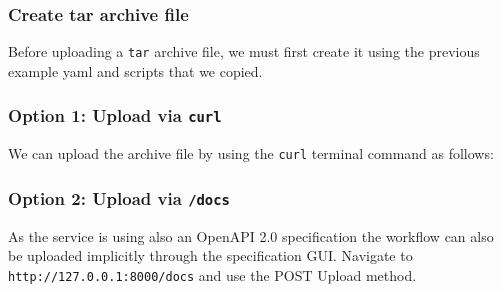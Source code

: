 \hypertarget{create-tar-archive-file}{%
\subsubsection{Create tar archive file}\label{create-tar-archive-file}}

Before uploading a \texttt{tar} archive file, we must first create it
using the previous example yaml and scripts that we copied.

\begin{Shaded}
\begin{Highlighting}[]
 
\end{Highlighting}
\end{Shaded}

\hypertarget{option-1-upload-via-curl}{%
\subsubsection{\texorpdfstring{Option 1: Upload via
\texttt{curl}}{Option 1: Upload via curl}}\label{option-1-upload-via-curl}}

We can upload the archive file by using the \texttt{curl} terminal
command as follows:

\begin{Shaded}
\begin{Highlighting}[]
   \DataTypeTok{\textbackslash{}}
   \DataTypeTok{\textbackslash{}}
    \DataTypeTok{\textbackslash{}}
   \StringTok{\textquotesingle{}\textquotesingle{}}
\end{Highlighting}
\end{Shaded}

\hypertarget{option-2-upload-via-docs}{%
\subsubsection{\texorpdfstring{Option 2: Upload via
\texttt{/docs}}{Option 2: Upload via /docs}}\label{option-2-upload-via-docs}}

As the service is using also an OpenAPI 2.0 specification the workflow
can also be uploaded implicitly through the specification GUI. Navigate
to \texttt{http://127.0.0.1:8000/docs} and use the POST Upload method.

